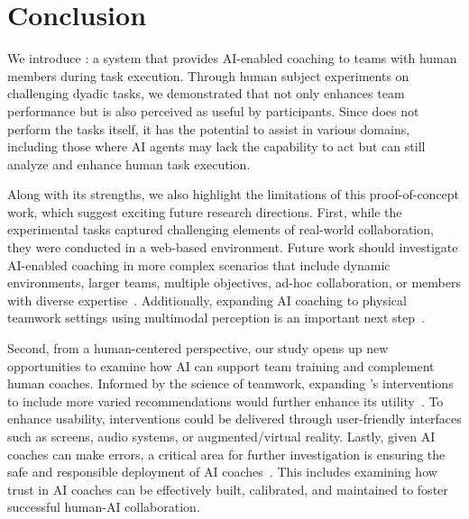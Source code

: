 \section{Conclusion}
\label{sec: conclusion}
We introduce \coach: a system that provides AI-enabled coaching to teams with human members during task execution. Through human subject experiments on challenging dyadic tasks, we demonstrated that \coach not only enhances team performance but is also perceived as useful by participants. Since \coach does not perform the tasks itself, it has the potential to assist in various domains, including those where AI agents may lack the capability to act but can still analyze and enhance human task execution.

Along with its strengths, we also highlight the limitations of this proof-of-concept work, which suggest exciting future research directions. First, while the experimental tasks captured challenging elements of real-world collaboration, they were conducted in a web-based environment. Future work should investigate AI-enabled coaching in more complex scenarios that include dynamic environments, larger teams, multiple objectives, ad-hoc collaboration, or members with diverse expertise~\cite{stone2010ad, seo2024idil, seo2025hierarchical}. Additionally, expanding AI coaching to physical teamwork settings using multimodal perception is an important next step~\cite{wang2019ai, xia2025sportu}.

Second, from a human-centered perspective, our study opens up new opportunities to examine how AI can support team training and complement human coaches. Informed by the science of teamwork, expanding \coach's interventions to include more varied recommendations would further enhance its utility~\cite{peters2013team, weaver2014team, britton2015expanding}. To enhance usability, interventions could be delivered through user-friendly interfaces such as screens, audio systems, or augmented/virtual reality.
Lastly, given AI coaches can make errors, a critical area for further investigation is ensuring the safe and responsible deployment of AI coaches~\cite{hoffman2013trust,  yang2017evaluating, qian2022evaluating, quintero2023robotic, qian2024pps, meneses2024perceptions}. This includes examining how trust in AI coaches can be effectively built, calibrated, and maintained to foster successful human-AI collaboration.
